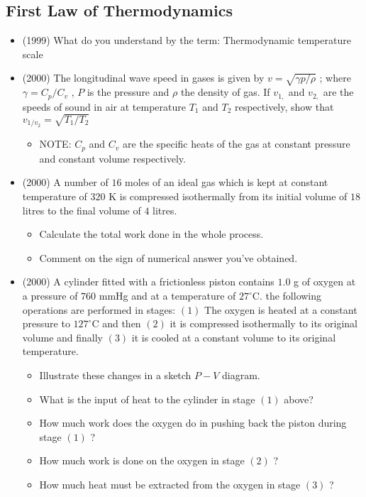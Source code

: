 \documentclass{article}
\begin{document}
\subsection{First Law of Thermodynamics}
\begin{itemize}
\item (1999)  What do you understand by the term: Thermodynamic temperature scale
\item (2000)  The longitudinal wave speed in gases is given by $ v=\sqrt{\gamma p/ \rho }$ ; where $ \gamma =C_{p}/C_{v}$ , $ P$ is the pressure and $ \rho $ the density of gas. If $ v_{1,}$ and $ v_{2,}$ are the speeds of sound in air at temperature $ T_{1}$ and $ T_{2}$ respectively, show that $ v_{1/v_2}=\sqrt{T_{1}/T_{2}}$
 \begin{itemize}
\item NOTE: $ C_{p}$ and $ C_{v}$ are the specific heats of the gas at constant pressure and constant volume respectively.
\end{itemize}
\item (2000)  A number of $ 16$ moles of an ideal gas which is kept at constant temperature of $ 320$ K is compressed isothermally from its initial volume of $ 18$ litres to the final volume of $ 4$ litres.
 \begin{itemize}
\item Calculate the total work done in the whole process.
\item Comment on the sign of numerical answer you've obtained.
\end{itemize}
\item (2000)  A cylinder fitted with a frictionless piston contains $ 1.0$ g of oxygen at a pressure of $ 760$ mmHg and at a temperature of $ 27^{\circ}$C. the following operations are performed in stages: $ (1)$ The oxygen is heated at a constant pressure to $ 127^{\circ}$C and then $ (2)$ it is compressed isothermally to its original volume and finally $ (3)$ it is cooled at a constant volume to its original temperature.
 \begin{itemize}
\item Illustrate these changes in a sketch $ P-V$ diagram.
\item What is the input of heat to the cylinder in stage $ (1)$ above?
\item How much work does the oxygen do in pushing back the piston during stage $ (1)$ ?
\item How much work is done on the oxygen in stage $ (2)$ ?
\item How much heat must be extracted from the oxygen in stage $ (3)$ ? 

\end{itemize}
\end{itemize}
\end{document}
